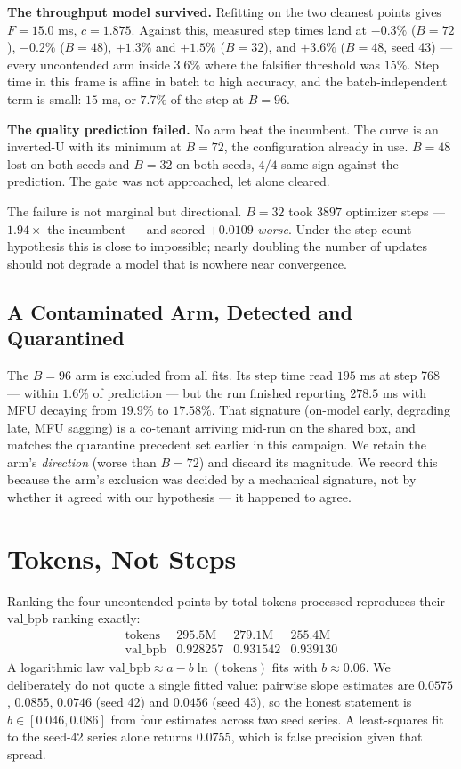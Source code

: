 \documentclass{article}
\newcommand{\valbpb}{\mathrm{val\_bpb}}
\begin{document}
\textbf{The throughput model survived.} Refitting on the two cleanest points gives $F = 15.0$ ms, $c = 1.875$. Against this, measured step times land at $-0.3\%$ ($B{=}72$), $-0.2\%$ ($B{=}48$), $+1.3\%$ and $+1.5\%$ ($B{=}32$), and $+3.6\%$ ($B{=}48$, seed 43) --- every uncontended arm inside $3.6\%$ where the falsifier threshold was $15\%$. Step time in this frame is affine in batch to high accuracy, and the batch-independent term is small: $15$ ms, or $7.7\%$ of the step at $B{=}96$.

\textbf{The quality prediction failed.} No arm beat the incumbent. The curve is an inverted-U with its minimum at $B{=}72$, the configuration already in use. $B{=}48$ lost on both seeds and $B{=}32$ on both seeds, $4/4$ same sign against the prediction. The gate was not approached, let alone cleared.

The failure is not marginal but directional. $B{=}32$ took $3897$ optimizer steps --- $1.94\times$ the incumbent --- and scored $+0.0109$ \emph{worse}. Under the step-count hypothesis this is close to impossible; nearly doubling the number of updates should not degrade a model that is nowhere near convergence.

\subsection{A Contaminated Arm, Detected and Quarantined}
\label{sec:quar}
The $B{=}96$ arm is excluded from all fits. Its step time read $195$ ms at step 768 --- within $1.6\%$ of prediction --- but the run finished reporting $278.5$ ms with MFU decaying from $19.9\%$ to $17.58\%$. That signature (on-model early, degrading late, MFU sagging) is a co-tenant arriving mid-run on the shared box, and matches the quarantine precedent set earlier in this campaign. We retain the arm's \emph{direction} (worse than $B{=}72$) and discard its magnitude. We record this because the arm's exclusion was decided by a mechanical signature, not by whether it agreed with our hypothesis --- it happened to agree.

\section{Tokens, Not Steps}
Ranking the four uncontended points by total tokens processed reproduces their $\valbpb$ ranking exactly:
\[
\begin{array}{lccc}
\text{tokens} & 295.5\text{M} & 279.1\text{M} & 255.4\text{M} \\
\valbpb & 0.928257 & 0.931542 & 0.939130
\end{array}
\]
A logarithmic law $\valbpb \approx a - b\ln(\mathrm{tokens})$ fits with $b \approx 0.06$. We deliberately do not quote a single fitted value: pairwise slope estimates are $0.0575$, $0.0855$, $0.0746$ (seed 42) and $0.0456$ (seed 43), so the honest statement is $b \in [0.046, 0.086]$ from four estimates across two seed series. A least-squares fit to the seed-42 series alone returns $0.0755$, which is false precision given that spread.
\end{document}
